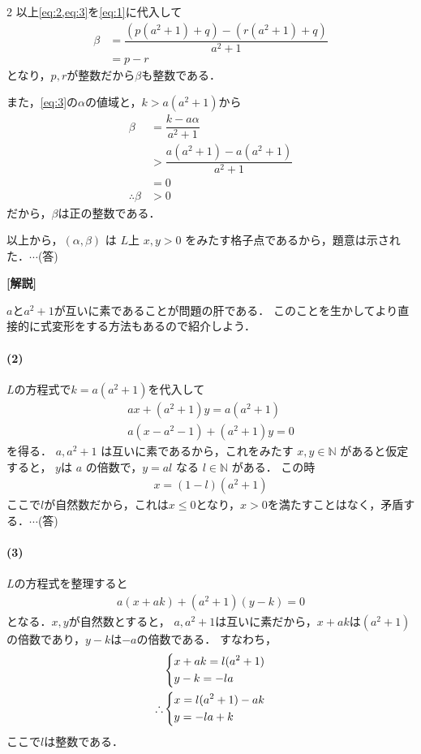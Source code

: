 \documentclass[../../main.tex]{subfiles}
\begin{document}
\begin{multicols}{2}
  以上\cref{eq:2,eq:3}を\cref{eq:1}に代入して
  \begin{align}
    \beta
    & = \dfrac{(p(a^2+1) + q) - (r(a^2+1)+q)}{a^2+1} \\
    & = p - r
  \end{align}
  となり，$p,r$が整数だから$\beta$も整数である．

  また，\cref{eq:3}の$\alpha$の値域と，$k>a(a^2+1)$から
  \begin{align}
    \beta
    & = \dfrac{k-a\alpha}{a^2+1}        \\
    & > \dfrac{a(a^2+1)-a(a^2+1)}{a^2+1} \\
    & = 0                              \\
    \therefore
    \beta & > 0
  \end{align}
  だから，$\beta$は正の整数である．

  以上から，$(\alpha, \beta)$ は $L$上 $x, y > 0$ をみたす格子点であるから，題意は示された．$\cdots$(答)

  {\bf [解説]}

  $a$と$a^2+1$が互いに素であることが問題の肝である．
  このことを生かしてより直接的に式変形をする方法もあるので紹介しよう．

  \paragraph{(2)}
  $L$の方程式で$k=a(a^2+1)$を代入して
  \begin{align}
    ax + (a^2+1)y = a(a^2+1) \\
    a\left( x - a^2 - 1 \right) + (a^2+1)y = 0
  \end{align}
  を得る．
  $a, a^2+1$ は互いに素であるから，これをみたす $x, y \in \mathbb{N}$ があると仮定すると，
  $y$は $a$ の倍数で，$y=al$ なる $l \in \mathbb{N}$ がある．
  この時
  \begin{align}
    x = (1-l)(a^2+1)
  \end{align}
  ここで$l$が自然数だから，これは$x\le 0$となり，$x>0$を満たすことはなく，矛盾する．$\cdots$(答)

  \paragraph{(3)}
  $L$の方程式を整理すると
  \begin{align}
    a(x+ak) + (a^2+1)(y-k) = 0
  \end{align}
  となる．$x,y$が自然数とすると，
  $a, a^2+1$は互いに素だから，$x+ak$は$(a^2+1)$の倍数であり，$y-k$は$-a$の倍数である．
  すなわち，
  \begin{align}
    &
    \begin{dcases}
      x + ak = l(a^2+1) \\
      y - k = -la
    \end{dcases} \\
    \therefore
    &
    \begin{dcases}
      x = l(a^2+1) -ak \\
      y = -la + k
    \end{dcases}
  \end{align}
  ここで$l$は整数である．


\end{multicols}
\end{document}
